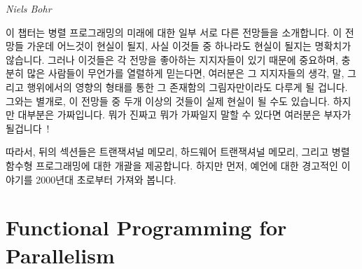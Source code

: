 
%
	 {\emph{Niels Bohr}}

이 챕터는 병렬 프로그래밍의 미래에 대한 일부 서로 다른 전망들을 소개합니다.
이 전망들 가운데 어느것이 현실이 될지, 사실 이것들 중 하나라도 현실이 될지는
명확치가 않습니다.
그러나 이것들은 각 전망을 좋아하는 지지자들이 있기 때문에 중요하며, 충분히 많은
사람들이 무언가를 열렬하게 믿는다면, 여러분은 그 지지자들의 생각, 말, 그리고
행위에서의 영향의 형태를 통한 그 존재함의 그림자만이라도 다루게 될 겁니다.
그와는 별개로, 이 전망들 중 두개 이상의 것들이 실제 현실이 될 수도 있습니다.
하지만 대부분은 가짜입니다.
뭐가 진짜고 뭐가 가짜일지 말할 수 있다면 여러분은 부자가
될겁니다~\cite{KeithRSpitz1977}!

따라서, 뒤의 섹션들은 트랜잭셔널 메모리, 하드웨어 트랜잭셔널 메모리, 그리고
병렬 함수형 프로그래밍에 대한 개괄을 제공합니다.
하지만 먼저, 예언에 대한 경고적인 이야기를 2000년대 초로부터 가져와 봅니다.
\iffalse

This chapter presents some conflicting visions of the future of parallel
programming.
It is not clear which of these will come to pass, in fact, it is not
clear that any of them will.
They are nevertheless important because each vision has its devoted
adherents, and if enough people believe in something fervently enough,
you will need to deal with at least the shadow of that thing's existence
in the form of its
influence on the thoughts, words, and deeds of its adherents.
Besides which, it is entirely possible that one or more of these visions
will actually come to pass.
But most are bogus.
Tell which is which and you'll be rich~\cite{KeithRSpitz1977}!

Therefore, the following sections give an overview of transactional
memory, hardware transactional memory,
parallel functional programming, and quantum computing.
But first, a cautionary tale on prognostication taken from the early 2000s.
\fi





\section{Functional Programming for Parallelism}
\label{sec:future:Functional Programming for Parallelism}

